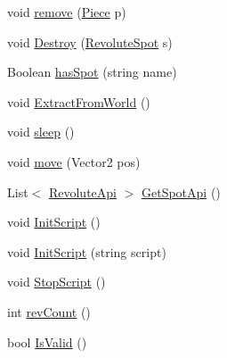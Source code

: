 \begin{DoxyCompactItemize}
\item 
void \hyperlink{classgearit_1_1src_1_1robot_1_1_robot_ad710fe35764a4c9b9a8592b5ef84bb78}{remove} (\hyperlink{classgearit_1_1src_1_1robot_1_1_piece}{Piece} p)
\item 
void \hyperlink{classgearit_1_1src_1_1robot_1_1_robot_a2043671ae95e91ba15e81d0bd8089ea0}{Destroy} (\hyperlink{classgearit_1_1src_1_1robot_1_1_revolute_spot}{Revolute\+Spot} s)
\item 
Boolean \hyperlink{classgearit_1_1src_1_1robot_1_1_robot_adb0d689b0376ab03435aa586c3b513ff}{has\+Spot} (string name)
\item 
void \hyperlink{classgearit_1_1src_1_1robot_1_1_robot_a1caf43e0e86dd7b4496ff514012d5b27}{Extract\+From\+World} ()
\item 
void \hyperlink{classgearit_1_1src_1_1robot_1_1_robot_ac3ea0430afb81b56abfd324bbaaad15f}{sleep} ()
\item 
void \hyperlink{classgearit_1_1src_1_1robot_1_1_robot_aaf9a7aeb3822bc050a9323f25423814a}{move} (Vector2 pos)
\item 
List$<$ \hyperlink{classgearit_1_1src_1_1script_1_1_revolute_api}{Revolute\+Api} $>$ \hyperlink{classgearit_1_1src_1_1robot_1_1_robot_a563fe3f12327cc63d73a6c818034e8b1}{Get\+Spot\+Api} ()
\item 
void \hyperlink{classgearit_1_1src_1_1robot_1_1_robot_a7b87738882d4eb4e3dc0660debf7aa3f}{Init\+Script} ()
\item 
void \hyperlink{classgearit_1_1src_1_1robot_1_1_robot_abbb720472fefb50aae4935e7f79fa039}{Init\+Script} (string script)
\item 
void \hyperlink{classgearit_1_1src_1_1robot_1_1_robot_aa7cc9b5606c73f0d474c2a0821cb213f}{Stop\+Script} ()
\item 
int \hyperlink{classgearit_1_1src_1_1robot_1_1_robot_a846f4585c9dabff7be05740bcc4bb746}{rev\+Count} ()
\item 
bool \hyperlink{classgearit_1_1src_1_1robot_1_1_robot_ad5d25dde2531e1db0446c92d0aeda566}{Is\+Valid} ()
\end{DoxyCompactItemize}
